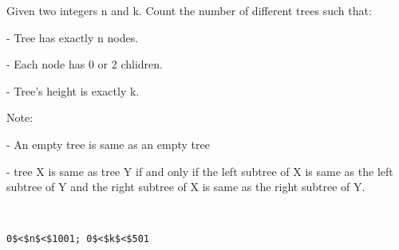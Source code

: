 Given two integers n and k. Count the number of different trees such that:  

   - Tree has exactly n nodes.  

   - Each node has 0 or 2 chlidren.  

   - Tree's height is exactly k.  

   Note:  

   - An empty tree is same as an empty tree  

   - tree X is same as tree Y if and only if the left subtree of X is same as the left subtree of Y and the right subtree of X is same as the right subtree of Y.
\begin{verbatim}


0$<$n$<$1001; 0$<$k$<$501\end{verbatim}
